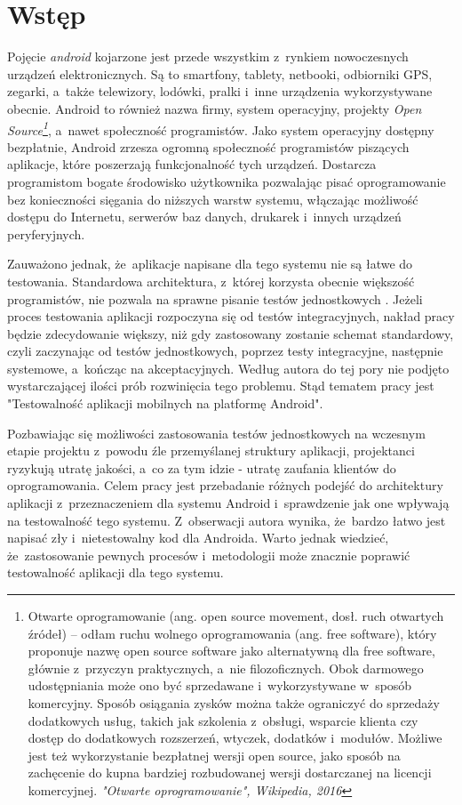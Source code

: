 \chapter*{Wstęp}
\label{wstep}

Pojęcie \textit{android} kojarzone jest przede wszystkim z~rynkiem nowoczesnych urządzeń elektronicznych. Są to smartfony, tablety, netbooki, odbiorniki GPS, zegarki, a~także telewizory, lodówki, pralki i~inne urządzenia wykorzystywane obecnie. Android to również nazwa firmy, system operacyjny, projekty \textit{Open Source\footnote{Otwarte oprogramowanie (ang. open source movement, dosł. ruch otwartych źródeł) – odłam ruchu wolnego oprogramowania (ang. free software), który proponuje nazwę open source software jako alternatywną dla free software, głównie z~przyczyn praktycznych, a~nie filozoficznych. Obok darmowego udostępniania może ono być sprzedawane i~wykorzystywane w~sposób komercyjny. Sposób osiągania zysków można także ograniczyć do sprzedaży dodatkowych usług, takich jak szkolenia z~obsługi, wsparcie klienta czy dostęp do dodatkowych rozszerzeń, wtyczek, dodatków i~modułów. Możliwe jest też wykorzystanie bezpłatnej wersji open source, jako sposób na zachęcenie do kupna bardziej rozbudowanej wersji dostarczanej na licencji komercyjnej. \textit{"Otwarte oprogramowanie", Wikipedia, 2016}}}, a~nawet społeczność programistów. Jako system operacyjny dostępny bezpłatnie, Android zrzesza ogromną społeczność programistów piszących aplikacje, które poszerzają funkcjonalność tych urządzeń. Dostarcza programistom bogate środowisko użytkownika pozwalając pisać oprogramowanie bez konieczności sięgania do niższych warstw systemu, włączając możliwość dostępu do Internetu, serwerów baz danych, drukarek i~innych urządzeń peryferyjnych. 

Zauważono jednak, że~aplikacje napisane dla tego systemu nie są łatwe do testowania. Standardowa architektura, z~której korzysta obecnie większość programistów, nie pozwala na sprawne pisanie testów jednostkowych \cite{tematpracy}. Jeżeli proces testowania aplikacji rozpoczyna się od testów integracyjnych, nakład pracy będzie zdecydowanie większy, niż gdy zastosowany zostanie schemat standardowy, czyli zaczynając od testów jednostkowych, poprzez testy integracyjne, następnie systemowe, a~kończąc na akceptacyjnych. Według autora do tej pory nie podjęto wystarczającej ilości prób rozwinięcia tego problemu. Stąd tematem pracy jest "Testowalność aplikacji mobilnych na platformę Android". 

Pozbawiając się możliwości zastosowania testów jednostkowych na wczesnym etapie projektu z~powodu źle przemyślanej struktury aplikacji, projektanci ryzykują utratę jakości, a~co za tym idzie - utratę zaufania klientów do oprogramowania. Celem pracy jest przebadanie różnych podejść do architektury aplikacji z~przeznaczeniem dla systemu Android i~sprawdzenie jak one wpływają na testowalność tego systemu. Z~obserwacji autora wynika, że~bardzo łatwo jest napisać zły i~nietestowalny kod dla Androida. Warto jednak wiedzieć, że~zastosowanie pewnych procesów i~metodologii może znacznie poprawić testowalność aplikacji dla tego systemu. 

